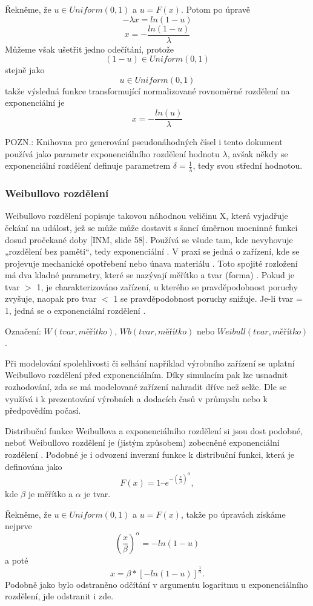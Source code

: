 \documentclass[a4paper,11pt]{article}
\begin{document}
Řekněme, že $u \in Uniform(0,1)$ a $u = F(x)$. Potom po úpravě 
$$-\lambda x = ln(1-u)$$
$$x = -\frac {ln(1-u)}{\lambda}$$
Můžeme však ušetřit jedno odečítání, protože $$(1-u) \in Uniform(0,1)$$ stejně jako $$u \in Uniform(0,1)$$ takže výsledná funkce transformující normalizované rovnoměrné rozdělení na exponenciální je 
$$x = -\frac{ln(u)}{\lambda}$$

POZN.: Knihovna pro generování pseudonáhodných čísel i tento dokument používá jako parametr exponenciálního rozdělení hodnotu $\lambda$, avšak někdy se exponenciální rozdělení definuje parametrem $\delta = \frac{1}{\lambda}$, tedy svou střední hodnotou.

\subsubsection{Weibullovo rozdělení}

Weibullovo rozdělení popisuje takovou náhodnou veličinu X, která vyjadřuje čekání na událost, jež se může může dostavit s šancí úměrnou mocninné funkci dosud pročekané doby [INM, slide 58]. Používá se všude tam, kde nevyhovuje „rozdělení bez paměti“, tedy exponenciální \cite{IASTAT} \cite{HOMEN}. V praxi se jedná o zařízení, kde se projevuje mechanické opotřebení nebo únava materiálu \cite{HOMEN}. Toto spojité rozložení má dva kladné parametry, které se nazývají měřítko a tvar (forma) \cite{Toupal} \cite{INM}. Pokud je tvar $>$ 1, je charakterizováno zařízení, u kterého se pravděpodobnost poruchy zvyšuje, naopak pro tvar $<$ 1 se pravděpodobnost poruchy snižuje. Je-li tvar = 1, jedná se o exponenciální rozdělení \cite{Toupal}.

Označení: $W(tvar, měřítko)$, $Wb(tvar, měřítko)$ nebo $Weibull(tvar, měřítko)$.

Při modelování spolehlivosti či selhání například výrobního zařízení se uplatní Weibullovo rozdělení před exponenciálním. Díky simulacím pak lze usnadnit rozhodování, zda se má modelované zařízení nahradit dříve než selže. Dle \cite{Toupal} se využívá i k prezentování výrobních a dodacích časů v průmyslu nebo k předpovědím počasí.

Distribuční funkce Weibullova a exponenciálního rozdělení si jsou dost podobné, neboť Weibullovo rozdělení je (jistým způsobem) zobecněné exponenciální rozdělení \cite{NR}. Podobné je i odvození inverzní funkce k distribuční funkci, která je definována jako $$F(x) = 1 – e^{-(\frac{x}{\beta})^{\alpha}},$$ kde $\beta$ je měřítko a $\alpha$ je tvar. 

Řekněme, že $u \in Uniform(0,1)$ a $u = F(x)$, takže po úpravách získáme nejprve 
$$\left(\frac{x}{\beta}\right)^\alpha = -ln(1-u)$$ 
a poté 
$$x = \beta * [-ln(1-u)]^{\frac{1}{\alpha}}.$$ 
Podobně jako bylo odstraněno odčítání v argumentu logaritmu u exponenciálního rozdělení, jde odstranit i zde.
\end{document}
